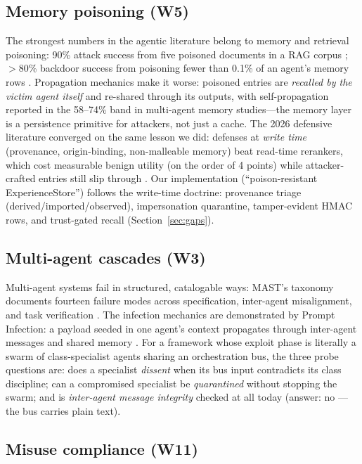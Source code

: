 \subsection{Memory poisoning (W5)}\label{sec:mem}

The strongest numbers in the agentic literature belong to memory and retrieval
poisoning: 90\% attack success from five poisoned documents in a RAG corpus
\cite{poisonedrag}; $>$80\% backdoor success from poisoning fewer than 0.1\% of
an agent's memory rows \cite{agentpoison}. Propagation mechanics make it worse:
poisoned entries are \emph{recalled by the victim agent itself} and re-shared
through its outputs, with self-propagation reported in the 58--74\% band in
multi-agent memory studies---the memory layer is a persistence primitive for
attackers, not just a cache. The 2026 defensive literature converged on the same
lesson we did: defenses at \emph{write time} (provenance, origin-binding,
non-malleable memory) beat read-time rerankers, which cost measurable benign
utility (on the order of 4 points) while attacker-crafted entries still slip
through \cite{memdef-origin,memdef-systematic}. Our implementation
(``poison-resistant ExperienceStore'') follows the write-time doctrine:
provenance triage (derived/imported/observed), impersonation quarantine,
tamper-evident HMAC rows, and trust-gated recall (Section~\ref{sec:gaps}).

\subsection{Multi-agent cascades (W3)}\label{sec:swarm}

Multi-agent systems fail in structured, catalogable ways: MAST's taxonomy
documents fourteen failure modes across specification, inter-agent
misalignment, and task verification \cite{mast}. The infection mechanics are
demonstrated by Prompt Infection: a payload seeded in one agent's context
propagates through inter-agent messages and shared memory \cite{promptinfection}.
For a framework whose exploit phase is literally a swarm of class-specialist
agents sharing an orchestration bus, the three probe questions are: does a
specialist \emph{dissent} when its bus input contradicts its class discipline;
can a compromised specialist be \emph{quarantined} without stopping the swarm;
and is \emph{inter-agent message integrity} checked at all today (answer: no ---
the bus carries plain text).

\subsection{Misuse compliance (W11)}\label{sec:misuse}

